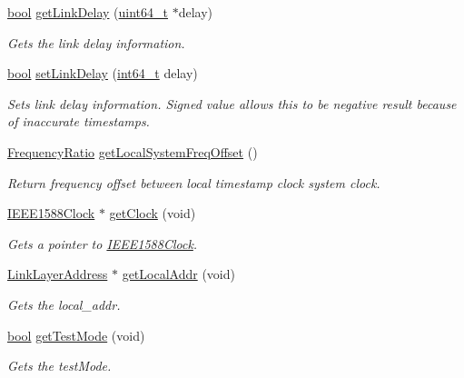 \begin{DoxyCompactItemize}
\hyperlink{avb__gptp_8h_af6a258d8f3ee5206d682d799316314b1}{bool} \hyperlink{class_common_port_a77e6b8d3c4cb0ed6775c1075e0dc0e93}{get\+Link\+Delay} (\hyperlink{parse_8c_aec6fcb673ff035718c238c8c9d544c47}{uint64\+\_\+t} $\ast$delay)
\begin{DoxyCompactList}\small\item\em Gets the link delay information. \end{DoxyCompactList}\item 
\hyperlink{avb__gptp_8h_af6a258d8f3ee5206d682d799316314b1}{bool} \hyperlink{class_common_port_aa6f951e3dbcfd28bf9c601746f9ac809}{set\+Link\+Delay} (\hyperlink{parse_8c_a67a9885ef4908cb72ce26d75b694386c}{int64\+\_\+t} delay)
\begin{DoxyCompactList}\small\item\em Sets link delay information. Signed value allows this to be negative result because of inaccurate timestamps. \end{DoxyCompactList}\item 
\hyperlink{ptptypes_8hpp_a84de47dc2ed889ecd2b61706d3ad0f2e}{Frequency\+Ratio} \hyperlink{class_common_port_a921c47366f1d2bc72191d6b5043c2678}{get\+Local\+System\+Freq\+Offset} ()
\begin{DoxyCompactList}\small\item\em Return frequency offset between local timestamp clock system clock. \end{DoxyCompactList}\item 
\hyperlink{class_i_e_e_e1588_clock}{I\+E\+E\+E1588\+Clock} $\ast$ \hyperlink{class_common_port_ab8e59ecfb51ec14e166bc8bfc872b1ef}{get\+Clock} (void)
\begin{DoxyCompactList}\small\item\em Gets a pointer to \hyperlink{class_i_e_e_e1588_clock}{I\+E\+E\+E1588\+Clock}. \end{DoxyCompactList}\item 
\hyperlink{class_link_layer_address}{Link\+Layer\+Address} $\ast$ \hyperlink{class_common_port_ab6607250666be12220407c6c12671f65}{get\+Local\+Addr} (void)
\begin{DoxyCompactList}\small\item\em Gets the local\+\_\+addr. \end{DoxyCompactList}\item 
\hyperlink{avb__gptp_8h_af6a258d8f3ee5206d682d799316314b1}{bool} \hyperlink{class_common_port_a98f6d8a0054a05b8e627d3f9ffc53be3}{get\+Test\+Mode} (void)
\begin{DoxyCompactList}\small\item\em Gets the test\+Mode. \end{DoxyCompactList}\item 

\end{DoxyCompactItemize}
